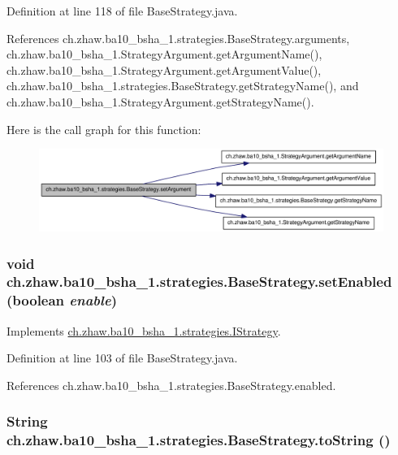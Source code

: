 Definition at line 118 of file BaseStrategy.java.

References ch.zhaw.ba10\_\-bsha\_\-1.strategies.BaseStrategy.arguments, ch.zhaw.ba10\_\-bsha\_\-1.StrategyArgument.getArgumentName(), ch.zhaw.ba10\_\-bsha\_\-1.StrategyArgument.getArgumentValue(), ch.zhaw.ba10\_\-bsha\_\-1.strategies.BaseStrategy.getStrategyName(), and ch.zhaw.ba10\_\-bsha\_\-1.StrategyArgument.getStrategyName().

Here is the call graph for this function:\nopagebreak
\begin{figure}[H]
\begin{center}
\leavevmode
\includegraphics[width=330pt]{classch_1_1zhaw_1_1ba10__bsha__1_1_1strategies_1_1BaseStrategy_ad1b20c8f3f41126c9e6cef52d3f30bbe_cgraph}
\end{center}
\end{figure}
\hypertarget{classch_1_1zhaw_1_1ba10__bsha__1_1_1strategies_1_1BaseStrategy_acfeb454c9eda3e3279c75ce8101d980c}{
\subsubsection[{setEnabled}]{\setlength{\rightskip}{0pt plus 5cm}void ch.zhaw.ba10\_\-bsha\_\-1.strategies.BaseStrategy.setEnabled (boolean {\em enable})}}
\label{classch_1_1zhaw_1_1ba10__bsha__1_1_1strategies_1_1BaseStrategy_acfeb454c9eda3e3279c75ce8101d980c}


Implements \hyperlink{interfacech_1_1zhaw_1_1ba10__bsha__1_1_1strategies_1_1IStrategy_ae95d5ca1a67248a3c6dd80b40d6f6a32}{ch.zhaw.ba10\_\-bsha\_\-1.strategies.IStrategy}.

Definition at line 103 of file BaseStrategy.java.

References ch.zhaw.ba10\_\-bsha\_\-1.strategies.BaseStrategy.enabled.\hypertarget{classch_1_1zhaw_1_1ba10__bsha__1_1_1strategies_1_1BaseStrategy_adfb24fbd69261e8567269c5d59365e46}{
\subsubsection[{toString}]{\setlength{\rightskip}{0pt plus 5cm}String ch.zhaw.ba10\_\-bsha\_\-1.strategies.BaseStrategy.toString ()}}
\label{classch_1_1zhaw_1_1ba10__bsha__1_1_1strategies_1_1BaseStrategy_adfb24fbd69261e8567269c5d59365e46}


